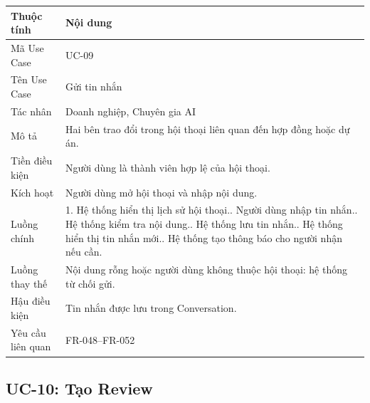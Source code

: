 \begin{longtable}{|p{3.5cm}|p{10.2cm}|}
\hline
\textbf{Thuộc tính} & \textbf{Nội dung} \\ \hline
Mã Use Case & UC-09 \\ \hline
Tên Use Case & Gửi tin nhắn \\ \hline
Tác nhân & Doanh nghiệp, Chuyên gia AI \\ \hline
Mô tả & Hai bên trao đổi trong hội thoại liên quan đến hợp đồng hoặc dự án. \\ \hline
Tiền điều kiện & Người dùng là thành viên hợp lệ của hội thoại. \\ \hline
Kích hoạt & Người dùng mở hội thoại và nhập nội dung. \\ \hline
Luồng chính &
1. Hệ thống hiển thị lịch sử hội thoại.\newline
2. Người dùng nhập tin nhắn.\newline
3. Hệ thống kiểm tra nội dung.\newline
4. Hệ thống lưu tin nhắn.\newline
5. Hệ thống hiển thị tin nhắn mới.\newline
6. Hệ thống tạo thông báo cho người nhận nếu cần. \\ \hline
Luồng thay thế & Nội dung rỗng hoặc người dùng không thuộc hội thoại: hệ thống từ chối gửi. \\ \hline
Hậu điều kiện & Tin nhắn được lưu trong Conversation. \\ \hline
Yêu cầu liên quan & FR-048--FR-052 \\ \hline
\end{longtable}

\subsection{UC-10: Tạo Review}

